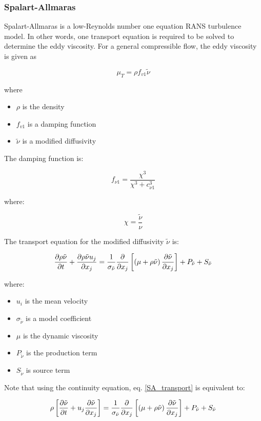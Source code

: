 \subsubsection{Spalart-Allmaras}

Spalart-Allmaras is a low-Reynolds number one equation RANS turbulence model. In other words, one transport equation is required to be solved to determine the eddy viscosity. For a general compressible flow, the eddy viscosity is given as 

\begin{equation}
\mu_T = \rho f_{v1} \tilde{\nu}
\end{equation}

\noindent where 

\begin{itemize}
\item $\rho$ is the density
\item $f_{v1}$ is a damping function 
\item $\tilde{\nu}$ is a modified diffusivity
\end{itemize}

\noindent The damping function is:

\begin{equation}
f_{\nu 1} = \frac{\chi^3}{\chi^3 + c_{\nu1}^3}
\end{equation}

\noindent where:

\begin{equation}
\chi = \frac{\tilde{\nu}}{\nu}
\end{equation}

\noindent The transport equation for the modified diffusivity $\tilde{\nu}$ is:

\begin{equation}
\pdv{\rho \tilde{\nu}}{t} + \pdv{\rho \tilde{\nu} u_j}{x_j} = \frac{1}{\sigma_{\tilde{\nu}}} \pdv{}{x_j} \left[ \left(\mu + \rho \tilde{\nu} \right) \pdv{\tilde{\nu}}{x_j} \right] + P_{\tilde{\nu}} + S_{\tilde{\nu}} \label{SA_transport}
\end{equation}

\noindent where:

\begin{itemize}
\item $u_i$ is the mean velocity
\item $\sigma_{\tilde{\nu}}$ is a model coefficient
\item $\mu$ is the dynamic viscosity
\item $P_{\tilde{\nu}}$ is the production term
\item $S_{\tilde{\nu}}$ is source term
\end{itemize}

\noindent Note that using the continuity equation, eq. \ref{SA_transport} is equivalent to:

\begin{equation}
\rho \left[ \pdv{\tilde{\nu}}{t} + u_j \pdv{\tilde{\nu}}{x_j} \right] = \frac{1}{\sigma_{\tilde{\nu}}} \pdv{}{x_j} \left[ \left(\mu + \rho \tilde{\nu} \right) \pdv{\tilde{\nu}}{x_j} \right] + P_{\tilde{\nu}} + S_{\tilde{\nu}}
\end{equation}

